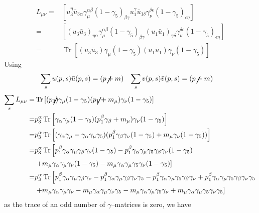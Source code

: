 \begin{align}
     L_{\mu\nu}=&\left[u_3^\eta\bar{u}_{3\alpha}\gamma_\mu^{\alpha\beta}(1-\gamma_5)_{\beta\gamma}u_1^\gamma\bar{u}_{1\delta}\gamma_\nu^{\delta\epsilon}(1-\gamma_5)_{\epsilon\eta}\right]\nonumber\\
     =&\left[(u_3\bar{u}_{3})_{\eta\alpha}\gamma_\mu^{\alpha\beta}(1-\gamma_5)_{\beta\gamma}(u_1\bar{u}_{1})_{\gamma\delta}\gamma_\nu^{\delta\epsilon}(1-\gamma_5)_{\epsilon\eta}\right]\nonumber\\
     =&\operatorname{Tr}\left[(u_3\bar{u}_{3})\gamma_\mu(1-\gamma_5)(u_1\bar{u}_{1})\gamma_\nu(1-\gamma_5)\right]
\end{align}
Using
\begin{align}
  \label{eq:111}
 \sum_su(p,s)\bar{u}(p,s)&=(\cancel{p}+m)& \sum_sv(p,s)\bar{v}(p,s)&=(\cancel{p}-m)
\end{align}
\begin{align}
  \sum_s L_{\mu\nu}=&\operatorname{Tr}\left[(\cancel{p}_3)\gamma_\mu(1-\gamma_5)(\cancel{p}_1+m_\mu)\gamma_\nu(1-\gamma_5)\right]\nonumber\\
  =&p_3^\alpha\operatorname{Tr}\left[\gamma_\alpha\gamma_\mu(1-\gamma_5)(p_1^\beta\gamma_\beta+m_\mu)\gamma_\nu(1-\gamma_5)\right]\nonumber\\
  =&p_3^\alpha\operatorname{Tr}\left[(\gamma_\alpha\gamma_\mu-\gamma_\alpha\gamma_\mu\gamma_5)(p_1^\beta\gamma_\beta\gamma_\nu(1-\gamma_5)+m_\mu\gamma_\nu(1-\gamma_5))\right]\nonumber\\
  =&p_3^\alpha\operatorname{Tr}\left[p_1^\beta\gamma_\alpha\gamma_\mu\gamma_\beta\gamma_\nu(1-\gamma_5)-p_1^\beta\gamma_\alpha\gamma_\mu\gamma_5\gamma_\beta\gamma_\nu(1-\gamma_5)\right.\nonumber\\
&\left.+m_\mu\gamma_\alpha\gamma_\mu\gamma_\nu(1-\gamma_5)-m_\mu\gamma_\alpha\gamma_\mu\gamma_5\gamma_\nu(1-\gamma_5)\right]\nonumber\\
  =&p_3^\alpha\operatorname{Tr}\left[p_1^\beta\gamma_\alpha\gamma_\mu\gamma_\beta\gamma_\nu-p_1^\beta\gamma_\alpha\gamma_\mu\gamma_\beta\gamma_\nu\gamma_5-p_1^\beta\gamma_\alpha\gamma_\mu\gamma_5\gamma_\beta\gamma_\nu
+p_1^\beta\gamma_\alpha\gamma_\mu\gamma_5\gamma_\beta\gamma_\nu\gamma_5\right.\nonumber\\
&\left.+m_\mu\gamma_\alpha\gamma_\mu\gamma_\nu-m_\mu\gamma_\alpha\gamma_\mu\gamma_\nu\gamma_5-m_\mu\gamma_\alpha\gamma_\mu\gamma_5\gamma_\nu+m_\mu\gamma_\alpha\gamma_\mu\gamma_5\gamma_\nu\gamma_5\right]
\end{align}
as the trace of an odd number of $\gamma$--matrices is zero, we have

